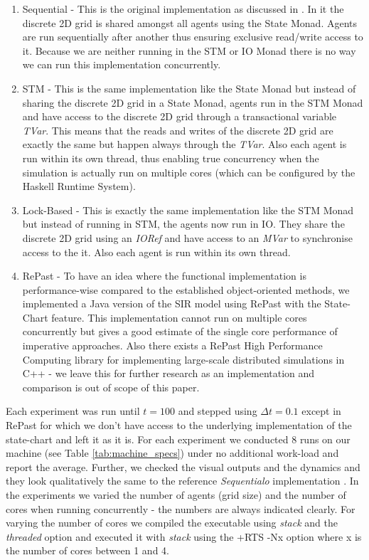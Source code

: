 \begin{enumerate}
	\item Sequential - This is the original implementation as discussed in \cite{thaler_pure_2019}. In it the discrete 2D grid is shared amongst all agents using the State Monad. Agents are run sequentially after another thus ensuring exclusive read/write access to it. Because we are neither running in the STM or IO Monad there is no way we can run this implementation concurrently.
	\item STM - This is the same implementation like the State Monad but instead of sharing the discrete 2D grid in a State Monad, agents run in the STM Monad and have access to the discrete 2D grid through a transactional variable \textit{TVar}. This means that the reads and writes of the discrete 2D grid are exactly the same but happen always through the \textit{TVar}. Also each agent is run within its own thread, thus enabling true concurrency when the simulation is actually run on multiple cores (which can be configured by the Haskell Runtime System).
	\item Lock-Based - This is exactly the same implementation like the STM Monad but instead of running in STM, the agents now run in IO. They share the discrete 2D grid using an \textit{IORef} and have access to an \textit{MVar} to synchronise access to the it. Also each agent is run within its own thread.
	\item RePast - To have an idea where the functional implementation is performance-wise compared to the established object-oriented methods, we implemented a Java version of the SIR model using RePast with the State-Chart feature. This implementation cannot run on multiple cores concurrently but gives a good estimate of the single core performance of imperative approaches. Also there exists a RePast High Performance Computing library for implementing large-scale distributed simulations in C++ - we leave this for further research as an implementation and comparison is out of scope of this paper.
\end{enumerate}

Each experiment was run until $t = 100$ and stepped using $\Delta t = 0.1$ except in RePast for which we don't have access to the underlying implementation of the state-chart and left it as it is. For each experiment we conducted 8 runs on our machine (see Table \ref{tab:machine_specs}) under no additional work-load and report the average. Further, we checked the visual outputs and the dynamics and they look qualitatively the same to the reference \textit{Sequentialo} implementation \cite{thaler_pure_2019}. In the experiments we varied the number of agents (grid size) and the number of cores when running concurrently - the numbers are always indicated clearly. For varying the number of cores we compiled the executable using \textit{stack} and the \textit{threaded} option and executed it with \textit{stack} using the +RTS -Nx option where x is the number of cores between 1 and 4. 

